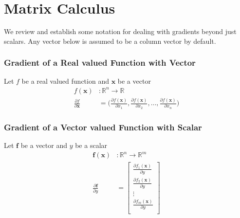 \documentclass[../../deep_learning_notes.tex]{subfiles}
\begin{document}
\section{Matrix Calculus}
We review and establish some notation for dealing with gradients beyond just scalars. Any vector below is assumed to be a column vector by default.


\subsubsection*{Gradient of a Real valued Function with Vector}
Let $f$ be a real valued function and $\bm{x}$ be a vector
\begin{align*}
    f(\bm{x})&: \mathbb{R}^{n} \rightarrow \mathbb{R}\\
    \frac{\partial f}{\partial \bm{x}} &= \bigg(\frac{\partial f(\bm{x})}{\partial x_{1}}, \frac{\partial f(\bm{x})}{\partial x_{2}},  \ldots, \frac{\partial f(\bm{x})}{\partial x_{n}} \bigg)
\end{align*}


\subsubsection*{Gradient of a Vector valued Function with Scalar}
Let $\bm{f}$ be a vector and $y$ be a scalar
\begin{align*}
    \bm{f}(\bm{x})&: \mathbb{R}^{n} \rightarrow \mathbb{R}^{m}\\
    \frac{\partial \bm{f}}{\partial y} &= \begin{bmatrix}
    \frac{\partial f_{1}(\bm{x})}{\partial y}\\
    \frac{\partial f_{2}(\bm{x})}{\partial y}\\
    \vdots\\
    \frac{\partial f_{m}(\bm{x})}{\partial y}\\
    \end{bmatrix}
\end{align*}


\end{document}
